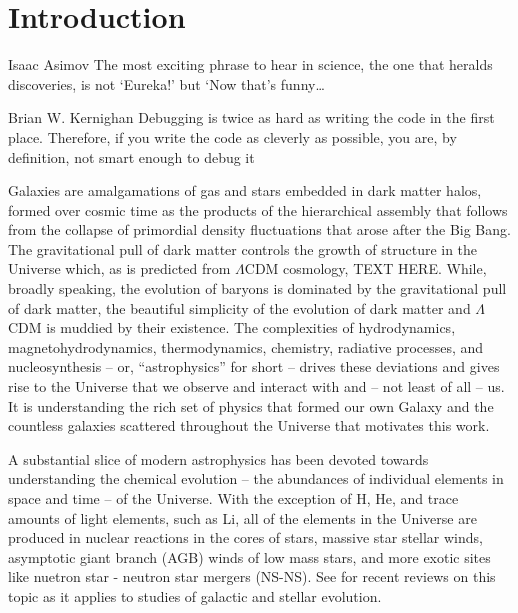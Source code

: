 \chapter[Introduction]{Introduction}
\label{ch:intro}
\vspace{-16pt} 
\begin{chapquote}{Isaac Asimov} \singlespacing The most exciting phrase to hear in science, the one that heralds discoveries, is not ‘Eureka!’ but ‘Now that’s funny…
\end{chapquote} \vspace{-8pt}
\begin{chapquote}{Brian W. Kernighan} \singlespacing Debugging is twice as hard as writing the code in the first place. Therefore, if you write the code as cleverly as possible, you are, by definition, not smart enough to debug it
\end{chapquote} \vspace{-8pt}

\noindent\makebox[\linewidth]{\rule{0.5\textwidth}{0.5pt}} \vspace{1pt}


%

Galaxies are amalgamations of gas and stars embedded in dark matter halos, formed over cosmic time as the products of the hierarchical assembly that follows from the collapse of primordial density fluctuations that arose after the Big Bang. The gravitational pull of dark matter controls the growth of structure in the Universe which, as is predicted from $\Lambda$CDM cosmology, TEXT HERE. While, broadly speaking, the evolution of baryons is dominated by the gravitational pull of dark matter, the beautiful simplicity of the evolution of dark matter and $\Lambda$CDM is muddied by their existence. The complexities of hydrodynamics, magnetohydrodynamics, thermodynamics, chemistry, radiative processes, and nucleosynthesis -- or, ``astrophysics'' for short -- drives these deviations and gives rise to the Universe that we observe and interact with and -- not least of all -- us. It is understanding the rich set of physics that formed our own Galaxy and the countless galaxies scattered throughout the Universe that motivates this work. 


A substantial slice of modern astrophysics has been devoted towards understanding the chemical evolution -- the abundances of individual elements in space and time -- of the Universe. With the exception of H, He, and trace amounts of light elements, such as Li, all of the elements in the Universe are produced in nuclear reactions in the cores of stars, massive star stellar winds, asymptotic giant branch (AGB) winds of low mass stars, and more exotic sites like nuetron star - neutron star mergers (NS-NS). See \cite{Nomoto2013, Thielmann2017, Frebel2018} for recent reviews on this topic as it applies to studies of galactic and stellar evolution. 

